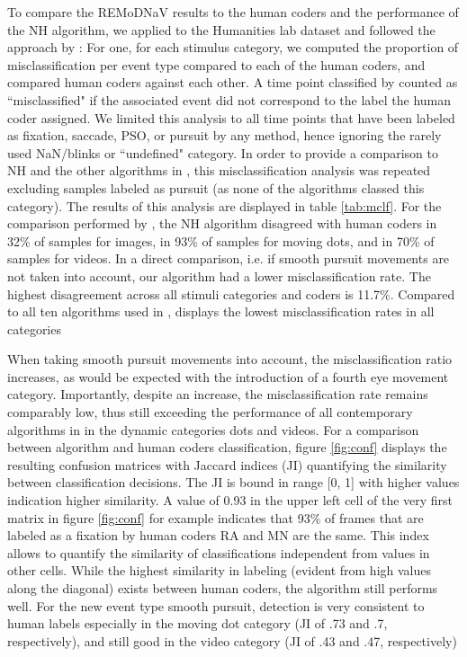 To compare the REMoDNaV results to the human coders and the performance of the NH algorithm, we applied \remodnav to
the Humanities lab dataset and followed the approach by \citet{Andersson2017}: For one, for each stimulus category,
we computed the proportion of misclassification per event type compared to each of the human coders, and compared
human coders against each other. A time point classified by \remodnav counted as ``misclassified" if the associated
event did not correspond to the label the human coder assigned. We limited this analysis to all time points that
have been labeled as fixation, saccade, PSO, or pursuit by any method, hence ignoring the rarely used NaN/blinks or
``undefined" category. In order to provide a comparison to NH and the other algorithms in \cite{Andersson2017}, this
misclassification analysis was repeated excluding samples labeled as pursuit (as none of the algorithms classed this
category). The results of this analysis are displayed in table \ref{tab:mclf}. For the comparison performed by
\citet{Andersson2017}, the NH algorithm disagreed with human coders in 32\% of samples for images, in 93\% of samples
for moving dots, and in 70\% of samples for videos. In a direct comparison, i.e. if smooth pursuit movements are
not taken into account, our algorithm had a lower misclassification rate. The highest disagreement across all stimuli
categories and coders is 11.7\%. Compared to all ten algorithms used in \citet{Andersson2017}, \remodnav displays
the lowest misclassification rates in all categories

When taking smooth pursuit movements into account, the misclassification ratio increases, as would be expected
with the introduction of a fourth eye movement category. Importantly, despite an increase, the misclassification
rate remains comparably low, thus still exceeding the performance of all contemporary algorithms in
\citet{Andersson2017} in the dynamic categories dots and videos. For a comparison between algorithm and human
coders classification, figure \ref{fig:conf} displays the resulting
confusion matrices with Jaccard indices (JI) quantifying the similarity between classification decisions. The
JI is bound in range [0, 1] with higher values indication higher similarity. A value of 0.93 in the upper
left cell of the very first matrix in figure \ref{fig:conf} for example indicates that 93\% of frames that are
labeled as a fixation by human coders RA and MN are the same. This index allows to quantify the similarity of
classifications independent from values in other cells. While the highest similarity in labeling (evident from
high values along the diagonal) exists between human coders, the algorithm still performs well. For the new event
type smooth pursuit, detection is very consistent to human labels especially in the moving dot category (JI of
.73 and .7, respectively), and still good in the video category (JI of .43 and .47, respectively)


